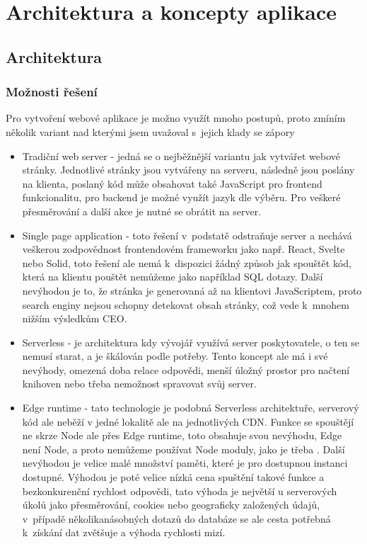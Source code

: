 \documentclass[12pt, a4paper,
openright
]{report}
\let\oldchapter\chapter
\renewcommand{\chapter}{
	\clearpage
	\pagestyle{fancy}
	\oldchapter
}
\begin{document}
\chapter{Architektura a koncepty aplikace}

\section{Architektura}

\subsection{Možnosti řešení}
Pro vytvoření webové aplikace je možno využít mnoho postupů, proto zmíním několik variant nad kterými jsem uvažoval s~jejich klady se zápory

\begin{itemize}
\item Tradiční web server - jedná se o nejběžnější variantu jak vytvářet webové stránky. Jednotlivé stránky jsou vytvářeny na serveru, následně jsou poslány na klienta, poslaný kód může obsahovat také JavaScript pro frontend funkcionalitu, pro backend je možné využít jazyk dle výběru. Pro veškeré přesměrování a další akce je nutné se obrátit na server.

\item Single page application - toto řešení v~podstatě odstraňuje server a nechává veškerou zodpovědnost frontendovém frameworku jako např. React, Svelte nebo Solid, toto řešení ale nemá k~dispozici žádný způsob jak spouštět kód, která na klientu pouštět nemůžeme jako například SQL dotazy. Další nevýhodou je to, že stránka je generovaná až na klientovi JavaScriptem, proto search enginy nejsou schopny detekovat obsah stránky, což vede k~mnohem nižším výsledkům CEO.

\item Serverless - je architektura kdy vývojář využívá server poskytovatele, o ten se nemusí starat, a je škálován podle potřeby. Tento koncept ale má i své nevýhody, omezená doba relace odpovědi, menší úložný prostor pro načtení knihoven nebo třeba nemožnost spravovat svůj server.

\item Edge runtime - tato technologie je podobná Serverless architektuře, serverový kód ale neběží v jedné lokalitě ale na jednotlivých CDN. Funkce se spouštějí ne skrze Node ale přes Edge runtime, toto obsahuje svou nevýhodu, Edge není Node, a proto nemůžeme používat Node moduly, jako je třeba . Další nevýhodou je velice malé množství paměti, které je pro dostupnou instanci dostupné. Výhodou je poté velice nízká cena spuštění takové funkce a bezkonkurenční rychlost odpovědi, tato výhoda je největší u serverových úkolů jako přesměrování, cookies nebo geograficky založených údajů, v~případě několikanásobných dotazů do databáze se ale cesta potřebná k~získání dat zvětšuje a výhoda rychlosti mizí.


\end{itemize}
\end{document}
